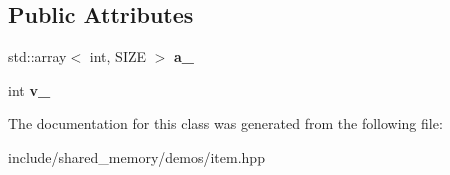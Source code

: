 \subsection*{Public Attributes}
\begin{DoxyCompactItemize}
\item 
\mbox{\label{classshared__memory_1_1Item_a3cb46d7a9776f0512cc8c3689278440b}} 
std\+::array$<$ int, S\+I\+ZE $>$ {\bfseries a\+\_\+}
\item 
\mbox{\label{classshared__memory_1_1Item_acd5944f0e62324ef0dc71b91ef9d7054}} 
int {\bfseries v\+\_\+}
\end{DoxyCompactItemize}


The documentation for this class was generated from the following file\+:\begin{DoxyCompactItemize}
\item 
include/shared\+\_\+memory/demos/item.\+hpp\end{DoxyCompactItemize}
